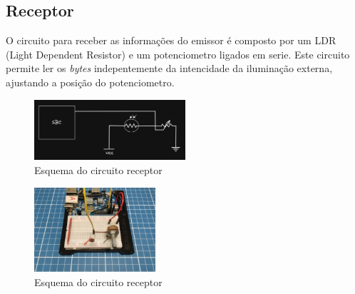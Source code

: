 \subsection{Receptor}

O circuito para receber as informações do emissor é composto por um LDR (Light Dependent Resistor) e um potenciometro ligados em serie. Este circuito permite ler os \emph{bytes} indepentemente da intencidade da iluminação externa, ajustando a posição do potenciometro.

\begin{figure}[!htbp]
  \includegraphics[width=0.5\textwidth]{images/esquema_circuito_receptor.png}
  \caption{Esquema do circuito receptor}
  \label{esquema-circuito-receptor}
\end{figure}


\begin{figure}[!htbp]
  \includegraphics[width=0.4\textwidth]{images/foto_circuito_receptor.jpg}
  \caption{Esquema do circuito receptor}
  \label{foto-circuito-receptor}
\end{figure}

